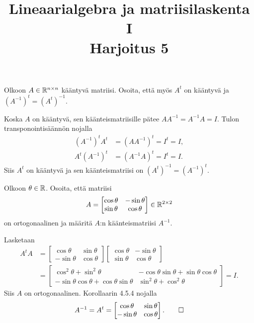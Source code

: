 \documentclass[11pt,a4paper]{amsart}
\title{Lineaarialgebra ja matriisilaskenta I\\Harjoitus 5}
\author{}
\date{}
\begin{document}

\begin{exercise}
  Olkoon \(A\in\mathbb{R}^{n\times n}\) kääntyvä matriisi. Osoita, että myös
  \(A^t\) on kääntyvä ja \((A^{-1})^t=(A^t)^{-1}\).
\end{exercise}

\begin{solution}
  Koska \(A\) on kääntyvä, sen käänteismatriisille pätee
  \(AA^{-1}=A^{-1}A=I\). Tulon transponointisäännön nojalla
  \[
    \begin{aligned}
      (A^{-1})^t A^t &= (AA^{-1})^t = I^t = I, \\
      A^t (A^{-1})^t &= (A^{-1}A)^t = I^t = I.
    \end{aligned}
  \]
  Siis \(A^t\) on kääntyvä ja sen käänteismatriisi on
  \((A^t)^{-1}=(A^{-1})^t\).
\end{solution}

\begin{exercise}
  Olkoon \(\theta\in\mathbb{R}\). Osoita, että matriisi
  \[
    A=
    \begin{bmatrix}
      \cos\theta & -\sin\theta \\
      \sin\theta & \cos\theta
    \end{bmatrix}\in\mathbb{R}^{2\times 2}
  \]
  on ortogonaalinen ja määritä \(A\):n käänteismatriisi \(A^{-1}\).
\end{exercise}

\begin{solution}
  Lasketaan
  \[
    \begin{aligned}
      A^tA
      &=
      \begin{bmatrix}
        \cos\theta & \sin\theta \\
        -\sin\theta & \cos\theta
      \end{bmatrix}
      \begin{bmatrix}
        \cos\theta & -\sin\theta \\
        \sin\theta & \cos\theta
      \end{bmatrix} \\
      &=
      \begin{bmatrix}
        \cos^2\theta+\sin^2\theta &
        -\cos\theta\sin\theta+\sin\theta\cos\theta \\
        -\sin\theta\cos\theta+\cos\theta\sin\theta &
        \sin^2\theta+\cos^2\theta
      \end{bmatrix}
      = I.
    \end{aligned}
  \]
  Siis \(A\) on ortogonaalinen. Korollaarin 4.5.4 nojalla
  \[
    A^{-1}=A^t=
    \begin{bmatrix}
      \cos\theta & \sin\theta \\
      -\sin\theta & \cos\theta
    \end{bmatrix}.\qedhere
  \]
\end{solution}
\end{document}
